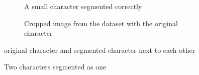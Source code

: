 
\begin{figure}[ht]
  \centering
  \begin{subfigure}{0.49\textwidth}
    \centering
    \caption{A small character segmented correctly}
    \label{fig:results:sw:s}
  \end{subfigure}
  \begin{subfigure}{0.49\textwidth}
    \centering
    \caption{Cropped image from the dataset with the original character}
    \label{fig:results:sw:o}
  \end{subfigure}
  \caption{original character and segmented character next to each other}
  \label{fig:results:sw}
\end{figure}


\begin{figure}[ht]
  \centering
  \caption{Two characters segmented as one}
  \label{fig:results:2i1}
\end{figure}

\newpage



